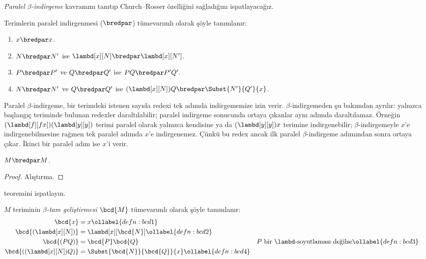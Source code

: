 



\emph{Paralel $\beta$-indirgeme} kavramını tanıtıp Church--Rosser özelliğini
sağladığını ispatlayacağız.

\begin{defn} 
  Terimlerin paralel indirgenmesi ($\bredpar$) tümevarımlı olarak şöyle
  tanımlanır:
  \begin{enumerate}
    \item {} $x \bredpar x$.
    \item {} $N \bredpar N'$ ise
      $\lambd[x][N] \bredpar \lambd[x][N']$.
    \item {} $P \bredpar P'$ ve $Q \bredpar Q'$ ise
      $PQ \bredpar P'Q'$.
    \item {} $N \bredpar N'$ ve $Q \bredpar Q'$ ise
      $(\lambd[x][N])Q \bredpar \Subst{N'}{Q'}{x}$.
  \end{enumerate}
\end{defn}

Paralel $\beta$-indirgeme, bir terimdeki istenen sayıda redexi tek adımda
indirgememize izin verir. $\beta$-indirgemeden şu bakımdan ayrılır: yalnızca
başlangıç teriminde bulunan redexler daraltılabilir; paralel indirgeme
sonucunda ortaya çıkanlar aynı adımda daraltılamaz. Örneğin
$(\lambd[f][fx])(\lambd[y][y])$ terimi paralel olarak yalnızca kendisine ya
da $(\lambd[y][y])x$ terimine indirgenebilir; $\beta$-indirgemeyle $x$'e
indirgenebilmesine rağmen tek paralel adımda $x$'e indirgenemez. Çünkü bu
redex ancak ilk paralel $\beta$-indirgeme adımından sonra ortaya çıkar. İkinci
bir paralel adım ise $x$'i verir.

\begin{thm}
  $M \bredpar M$.
\end{thm}

\begin{proof}
  Alıştırma.
\end{proof}

\begin{prob}
   teoremini ispatlayın.
\end{prob}

\begin{defn}
  $M$ teriminin \emph{$\beta$-tam geliştirmesi} $\bcd{M}$ tümevarımlı olarak
  şöyle tanımlanır:
  \begin{align}
    \bcd{x} &= x \ollabel{defn:bcd1} \\
    \bcd{(\lambd[x][N])} &= \lambd[x][\bcd{N}] \ollabel{defn:bcd2}\\
    \bcd{(PQ)} &= \bcd{P}\bcd{Q} && \text{$P$ bir $\lambd$-soyutlaması değilse}
    \ollabel{defn:bcd3} \\
    \bcd{((\lambd[x][N])Q)} &= \Subst{\bcd{N}}{\bcd{Q}}{x} \ollabel{defn:bcd4}
  \end{align}
\end{defn}

